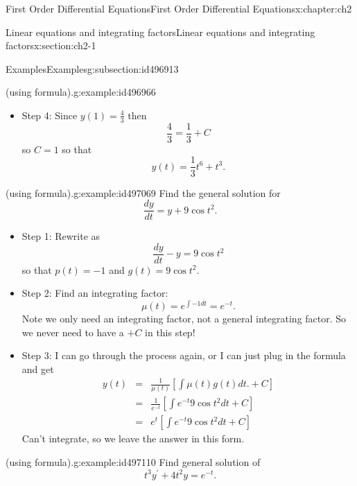 \documentclass[oneside,10pt,]{book}
\numberwithin{equation}{section}
\numberwithin{equation}{section}
\newcommand{\amp}{&}
\begin{document}
\begin{chapterptx}{First Order Differential Equations}{}{First Order Differential Equations}{}{}{x:chapter:ch2}
\begin{sectionptx}{Linear equations and integrating factors}{}{Linear equations and integrating factors}{}{}{x:section:ch2-1}
\begin{subsectionptx}{Examples}{}{Examples}{}{}{g:subsection:id496913}
\begin{example}{(using formula).}{g:example:id496966}
\begin{itemize}[label=\textbullet]
\begin{align*}
\amp = \amp t^{3}\left[\int\frac{1}{t^{3}}t^{5}dt+C\right]\\
\amp = \amp t^{3}\left[\frac{t^{3}}{3}+C\right]=\frac{1}{3}t^{6}+Ct^{3}.
\end{align*}
%
\item{}Step 4: Since \(y(1)=\frac{4}{3}\) then%
\begin{equation*}
\frac{4}{3}=\frac{1}{3}+C
\end{equation*}
so \(C=1\) so that%
\begin{equation*}
y(t)=\frac{1}{3}t^{6}+t^{3}.
\end{equation*}
%
\end{itemize}
\end{example}
\begin{example}{(using formula).}{g:example:id497069}%
Find the general solution for%
\begin{equation*}
\frac{dy}{dt}=y+9\cos t^{2}.
\end{equation*}
%
%
\begin{itemize}[label=\textbullet]
\item{}Step 1: Rewrite as%
\begin{equation*}
\frac{dy}{dt}-y=9\cos t^{2}
\end{equation*}
so that \(p(t)=-1\) and \(g(t)=9\cos t^{2}\).%
\item{}Step 2: Find an integrating factor:%
\begin{equation*}
\mu(t)=e^{\int-1dt}=e^{-t}.
\end{equation*}
Note we only need an integrating factor, not a general integrating factor. So we never need to have a \(+C\) in this step!%
\item{}Step 3: I can go through the process again, or I can just plug in the formula and get%
\begin{align*}
y(t) \amp = \amp \frac{1}{\mu(t)}\left[\int\mu(t)g(t)dt.+C\right]\\
\amp = \amp \frac{1}{e^{-t}}\left[\int e^{-t}9\cos t^{2}dt+C\right]\\
\amp = \amp e^{t}\left[\int e^{-t}9\cos t^{2}dt+C\right]
\end{align*}
Can't integrate, so we leave the answer in this form.%
\end{itemize}
\end{example}
\begin{example}{(using formula).}{g:example:id497110}%
Find general solution of%
\begin{equation*}
t^{3}y^{\prime}+4t^{2}y=e^{-t}.
\end{equation*}

\end{example}
\end{subsectionptx}
\end{sectionptx}
\end{chapterptx}
\end{document}
